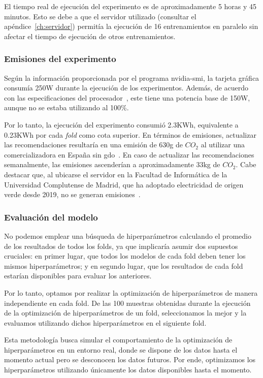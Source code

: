 El tiempo real de ejecución del experimento es de aproximadamente 5 horas y 45 minutos. Esto se debe a que el servidor utilizado (consultar el apéndice~\ref{ch:servidor}) permitía la ejecución de 16 entrenamientos en paralelo sin afectar el tiempo de ejecución de otros entrenamientos. 

\subsubsection{Emisiones del experimento}
Según la información proporcionada por el programa nvidia-smi, la tarjeta gráfica consumía 250W durante la ejecución de los experimentos. Además, de acuerdo con las especificaciones del procesador~\cite{intel_procesador_2022}, este tiene una potencia base de 150W, aunque no se estaba utilizando al 100\%.

Por lo tanto, la ejecución del experimento consumió 2.3KWh, equivalente a 0.23KWh por cada \textit{fold} como cota superior. En términos de emisiones, actualizar las recomendaciones resultaría en una emisión de 630g de $CO_2$ al utilizar una comercializadora en España sin \gls{gdo}~\cite{noauthor_anexo_2023}. En caso de actualizar las recomendaciones semanalmente, las emisiones ascenderían a aproximadamente 33kg de $CO_2$. Cabe destacar que, al ubicarse el servidor en la Facultad de Informática de la Universidad Complutense de Madrid, que ha adoptado electricidad de origen verde desde 2019, no se generan emisiones~\cite{vicerrectorado_de_tecnologia_y_sostenibilidad_informe_2021}.

\subsubsection{Evaluación del modelo}

No podemos emplear una búsqueda de hiperparámetros calculando el promedio de los resultados de todos los folds, ya que implicaría asumir dos supuestos cruciales: en primer lugar, que todos los modelos de cada fold deben tener los mismos hiperparámetros; y en segundo lugar, que los resultados de cada fold estarían disponibles para evaluar los anteriores.

Por lo tanto, optamos por realizar la optimización de hiperparámetros de manera independiente en cada fold. De las 100 muestras obtenidas durante la ejecución de la optimización de hiperparámetros de un fold, seleccionamos la mejor y la evaluamos utilizando dichos hiperparámetros en el siguiente fold.

Esta metodología busca simular el comportamiento de la optimización de hiperparámetros en un entorno real, donde se dispone de los datos hasta el momento actual pero se desconocen los datos futuros. Por ende, optimizamos los hiperparámetros utilizando únicamente los datos disponibles hasta el momento.

